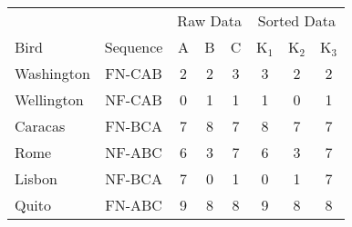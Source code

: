 \begin{tabular}{l|c|ccc||ccc}
\multicolumn{2}{c|}{} & \multicolumn{3}{c||}{\cellcolor{gray!20} Raw Data} & \multicolumn{3}{c}{\cellcolor{gray!20}Sorted Data}\\
Bird & Sequence & A & B & C & K$_1$  & K$_2$ & K$_3$ \\\midrule
Washington & FN-CAB & 2 & 2 & 3 & 3 & 2 & 2 \\
Wellington & NF-CAB & 0 & 1 & 1 & 1 & 0 & 1 \\
Caracas & FN-BCA & 7 & 8 & 7 & 8 & 7 & 7 \\
Rome & NF-ABC & 6 & 3 & 7 & 6 & 3 & 7 \\
Lisbon & NF-BCA & 7 & 0 & 1 & 0 & 1 & 7 \\
Quito & FN-ABC & 9 & 8 & 8 & 9 & 8 & 8 \\
\end{tabular}
